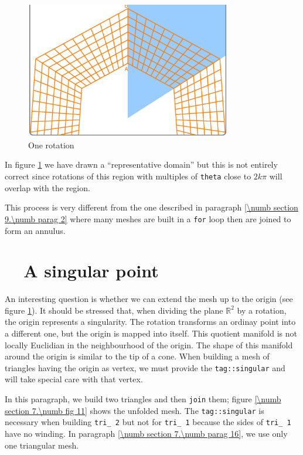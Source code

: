 \begin{figure}[ht] \centering
  \includegraphics[width=90mm]{sector-1.eps}
  \caption{One rotation}
  \label{\numb section 7.\numb fig 10}
\end{figure}

In figure \ref{\numb section 7.\numb fig 10}
we have drawn a ``representative domain'' but this is not entirely correct since
rotations of this region with multiples of {\small\tt theta} close to $ 2k\pi $
will overlap with the region.

This process is very different from the one described in paragraph
\ref{\numb section 9.\numb parag 2}
where many meshes are built in a {\small\tt for} loop then are joined to form an annulus.


\section{~~A singular point}\label{\numb section 7.\numb parag 15}

An interesting question is whether we can extend the mesh up to the origin
(see figure \ref{\numb section 7.\numb fig 10}).
It should be stressed that, when dividing the plane $ \mathbb{R}^2 $ by a rotation,
the origin represents a singularity.
The rotation transforms an ordinay point into a different one,
but the origin is mapped into itself.
This quotient manifold is not locally Euclidian in the neighbourhood of the origin.
The shape of this manifold around the origin is similar to the tip of a cone.
When building a mesh of triangles having the origin as vertex,
we must provide the {\small\tt\textcolor{tag}{tag}::singular}
and {\maniFEM} will take special care with that vertex.

In this paragraph, we build two triangles and then {\small\tt join} them;
figure \ref{\numb section 7.\numb fig 11} shows the unfolded mesh.
The {\small\tt\textcolor{tag}{tag}::singular} is necessary when building
{\small\tt tri\_\,2} but not for {\small\tt tri\_\,1}
because the sides of {\small\tt tri\_\,1} have no winding.
In paragraph \ref{\numb section 7.\numb parag 16}, we use only one triangular mesh.

